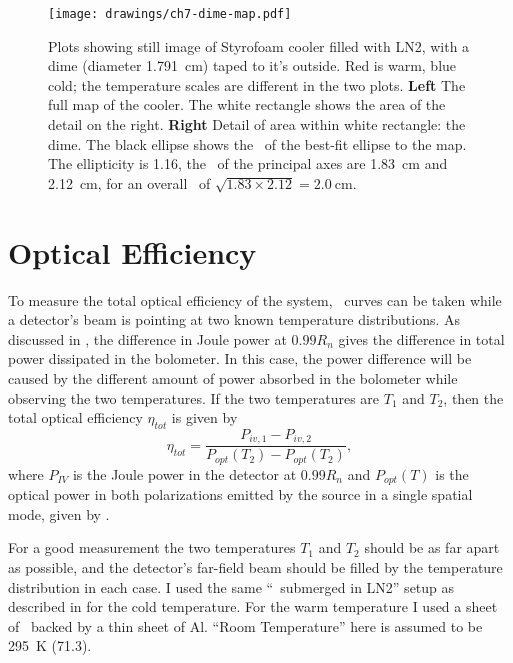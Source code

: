 \begin{figure}
\centering
\texttt{[image: drawings/ch7-dime-map.pdf]}
\caption[Image of LN2 cooler with dime]{
  Plots showing still image of Styrofoam cooler filled with LN2, with a dime (diameter \SI{1.791}{\cm}) taped to it's outside.
  Red is warm, blue cold; the temperature scales are different in the two plots.
  \textbf{Left} The full map of the cooler. The white rectangle shows the area of the detail on the right.
  \textbf{Right} Detail of area within white rectangle: the dime.
  The black ellipse shows the \FWHM\ of the best-fit ellipse to the map. The ellipticity is \num{1.16}, the \FWHM\ of the principal axes are \SI{1.83}{\cm} and \SI{2.12}{\cm}, for an overall \FWHM\ of $\sqrt{1.83 \times 2.12} = \SI{2.0}{\cm}$.
}
\label{fig:ch7-dime-map}
\end{figure}

\section{Optical Efficiency} \label{sec:ch7-opt-eff}

To measure the total optical efficiency of the system, \IV\ curves can be taken while a detector's beam is pointing at two known temperature distributions.
As discussed in , the difference in Joule power at $0.99 R_n$ gives the difference in total power dissipated in the bolometer.
In this case, the power difference will be caused by the different amount of power absorbed in the bolometer while observing the two temperatures.
If the two temperatures are $T_1$ and $T_2$, then the total optical efficiency $\eta_{tot}$ is given by
\begin{equation}
  \eta_{tot} = \frac{P_{iv,1} - P_{iv,2}}{P_{opt}(T_2) - P_{opt}(T_2)},
\end{equation}
where $P_{IV}$ is the Joule power in the detector at $0.99 R_n$ and $P_{opt}(T)$ is the optical power in both polarizations emitted by the source in a single spatial mode, given by .

For a good measurement the two temperatures $T_1$ and $T_2$ should be as far apart as possible, and the detector's far-field beam should be filled by the temperature distribution in each case.
I used the same ``\ecco\ submerged in LN2'' setup as described in  for the cold temperature.
For the warm temperature I used a sheet of \ecco\ backed by a thin sheet of Al.
``Room Temperature'' here is assumed to be \SI{295}{\kelvin} (\SI{71.3}{\fahrenheit}).

